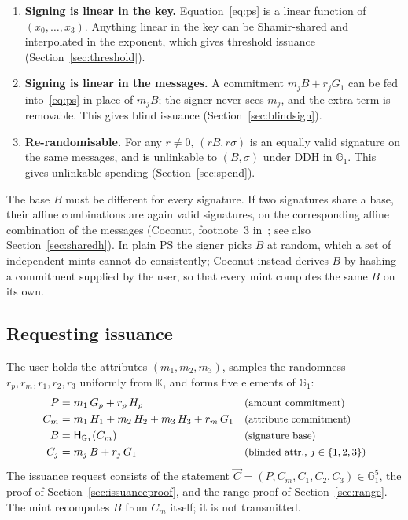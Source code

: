 \documentclass[10pt,a5paper]{article}
\newcommand{\annot}[2]{\text{\small #2}}   %
\newcommand{\annot}[2]{\text{#1}}
\newcommand{\K}[1]{#1}                      %
\newcommand{\Go}[1]{#1}                     %
\newcommand{\K}[1]{{\color{ScalarCol}#1}}   %
\newcommand{\Go}[1]{{\color{GoneCol}#1}}    %
\newcommand{\F}{\mathbb{K}}
\newcommand{\GG}[1]{\mathbb{G}_{#1}}
\newcommand{\Hg}{\mathsf{H}_{\GG{1}}}
\newcommand{\vv}[1]{\vec{#1}}
\begin{document}
\begin{whybox}
\begin{enumerate}[nosep,leftmargin=*]
\item \textbf{Signing is linear in the key.} Equation~\eqref{eq:ps} is a
  linear function of $(\K{x_0},\dots,\K{x_3})$. Anything linear in the key can
  be Shamir-shared and interpolated in the exponent, which gives threshold
  issuance (Section~\ref{sec:threshold}).
\item \textbf{Signing is linear in the messages.} A commitment $\K{m_j}\Go{B} + \K{r_j}\Go{G_1}$
  can be fed into~\eqref{eq:ps} in place of $\K{m_j}\Go{B}$; the signer never
  sees $\K{m_j}$, and the extra term is removable. This gives blind issuance
  (Section~\ref{sec:blindsign}).
\item \textbf{Re-randomisable.} For any $\K{r} \neq 0$, $(\K{r}\Go{B}, \K{r}\Go{\sigma})$
  is an equally valid signature on the same messages, and is unlinkable to
  $(\Go{B},\Go{\sigma})$ under DDH in $\GG{1}$. This gives unlinkable spending
  (Section~\ref{sec:spend}).
\end{enumerate}
\end{whybox}

The base $\Go{B}$ must be different for every signature. If two signatures share
a base, their affine combinations are again valid signatures, on the
corresponding affine combination of the messages (Coconut, footnote~3
in~\cite{coconut}; see also Section~\ref{sec:sharedh}). In plain PS the signer
picks $\Go{B}$ at random, which a set of independent mints cannot do
consistently; Coconut instead derives $\Go{B}$ by hashing a commitment supplied
by the user, so that every mint computes the same $\Go{B}$ on its own.

\subsection{Requesting issuance}
\label{sec:request}

The user holds the attributes $(\K{m_1},\K{m_2},\K{m_3})$, samples the
randomness $\K{r_p}, \K{r_m}, \K{r_1}, \K{r_2}, \K{r_3}$ uniformly from $\F$,
and forms five elements of $\GG{1}$:
\begin{align}
  \Go{P} &= \K{m_1}\,\Go{G_p} + \K{r_p}\,\Go{H_p}
     && \annot{(Pedersen commitment to the amount)}{(amount commitment)} \label{eq:pc} \\
  \Go{C_m} &= \K{m_1}\,\Go{H_1} + \K{m_2}\,\Go{H_2} + \K{m_3}\,\Go{H_3} + \K{r_m}\,\Go{G_1}
     && \annot{(commitment to all attributes)}{(attribute commitment)} \label{eq:cm} \\
  \Go{B} &= \Hg(\Go{C_m})
     && \annot{(derived signature base)}{(signature base)} \label{eq:h} \\
  \Go{C_j} &= \K{m_j}\,\Go{B} + \K{r_j}\,\Go{G_1}
     && \annot{(blinded attributes, $j \in \{1,2,3\}$)}{(blinded attr., $j \in \{1,2,3\}$)} \label{eq:cj}
\end{align}
The issuance request consists of the statement
$\vv{C} = (\Go{P}, \Go{C_m}, \Go{C_1}, \Go{C_2}, \Go{C_3}) \in \GG{1}^5$, the
proof of Section~\ref{sec:issuanceproof}, and the range proof of
Section~\ref{sec:range}. The mint recomputes $\Go{B}$ from $\Go{C_m}$ itself;
it is not transmitted.
\end{document}
